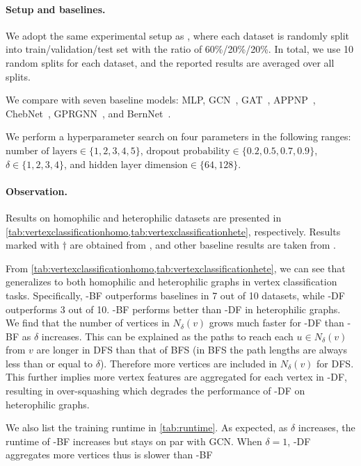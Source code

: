\paragraph{Setup and baselines.} We adopt the same experimental setup as \citet{bernnet21}, where each dataset is randomly split into train/validation/test set with the ratio of 60\%/20\%/20\%. In total, we use 10 random splits for each dataset, and the reported results are averaged over all splits.

We compare \model{} with seven baseline models: MLP, GCN~\citep{kipf2016semi}, GAT~\citep{velivckovic2017graph}, APPNP~\citep{KlicperaBG19}, ChebNet~\cite{defferrard2016convolutional}, GPRGNN~\citep{chien21}, and BernNet~\cite{bernnet21}.

We perform a hyperparameter search on four parameters in the following ranges:
$\text{number of layers}\in \{1, 2,3,4,5\}$,
$\text{dropout probability} \in \{0.2,0.5,0.7,0.9\}$,
$\delta\in\{1,2,3,4\}$, and
$\text{hidden layer dimension}\in\{64,128\}$.

\paragraph{Observation.}
Results on homophilic and heterophilic datasets are presented in \cref{tab:vertexclassificationhomo,tab:vertexclassificationhete}, respectively. Results marked with $\dagger$ are obtained from \citet{zhu2020beyond}, and other baseline results are taken from \citet{bernnet21}.

From \cref{tab:vertexclassificationhomo,tab:vertexclassificationhete}, we can see that \model{} generalizes to both homophilic and heterophilic graphs in vertex classification tasks. Specifically, \model{}-BF outperforms baselines in 7 out of 10 datasets, while \model{}-DF outperforms 3 out of 10. \model{}-BF performs better than \model{}-DF in heterophilic graphs. We find that the number of vertices in $N_{\delta}(v)$ grows much faster for \model{}-DF than \model{}-BF as $\delta$ increases. This can be explained as the paths to reach each $u\in N_{\delta}(v)$ from $v$ are longer in DFS than that of BFS (in BFS the path lengths are always less than or equal to $\delta$). Therefore more vertices are included in $N_{\delta}(v)$ for DFS. This further implies more vertex features are aggregated for each vertex in \model{}-DF, resulting in over-squashing which degrades the performance of \model{}-DF on heterophilic graphs.

We also list the training runtime in \cref{tab:runtime}. As expected, as $\delta$ increases, the runtime of \model{}-BF increases but stays on par with GCN. When $\delta=1$, \model{}-DF aggregates more vertices thus is slower than \model{}-BF

